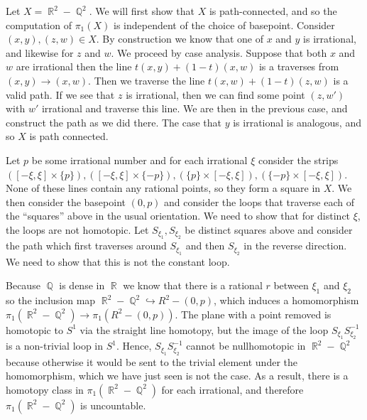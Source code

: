 \documentclass{article}
\DeclareMathOperator{\Q}{\mathbb{Q}}
\DeclareMathOperator{\R}{\mathbb{R}}
\DeclareMathOperator{\into}{\hookrightarrow}
\newcommand{\exercise}[1]{\noindent{\textbf{Exercise #1:}}}
\begin{document}
\exercise{1.2.17}

Let $X = \R^2 - \Q^2$. We will first show that $X$ is path-connected,
and so the computation of $\pi_1(X)$ is independent of the choice of
basepoint. Consider $(x,y),(z,w) \in X$. By construction we know that
one of $x$ and $y$ is irrational, and likewise for $z$ and $w$. We
proceed by case analysis. Suppose that both $x$ and $w$ are irrational
then the line $t(x,y) + (1-t)(x,w)$ is a traverses from $(x,y) \to
(x,w)$. Then we traverse the line $t(x,w) + (1-t)(z,w)$ is a valid
path. If we see that $z$ is irrational, then we can find some point
$(z,w')$ with $w'$ irrational and traverse this line. We are then in
the previous case, and construct the path as we did there. The case
that $y$ is irrational is analogous, and so $X$ is path connected.

Let $p$ be some irrational number and for each irrational $\xi$
consider the strips $([-\xi,\xi] \times \{p\}), ([-\xi,\xi] \times
\{-p\}), (\{p\} \times [-\xi,\xi]), (\{-p\} \times [-\xi,\xi])$. None
of these lines contain any rational points, so they form a square in
$X$. We then consider the basepoint $(0,p)$ and consider the loops
that traverse each of the ``squares'' above in the usual
orientation. We need to show that for distinct $\xi$, the loops are
not homotopic. Let $S_{\xi_1},S_{\xi_2}$ be distinct squares above and
consider the path which first traverses around $S_{\xi_1}$ and then
$S_{\xi_2}$ in the reverse direction. We need to show that this is not
the constant loop.

Because $\Q$ is dense in $\R$ we know that there is a rational $r$
between $\xi_1$ and $\xi_2$ so the inclusion map $\R^2 - \Q^2 \into
R^2 - (0,p)$, which induces a homomorphism $\pi_1(\R^2 - \Q^2) \to
\pi_1(R^2 - (0,p))$. The plane with a point removed is homotopic to
$S^1$ via the straight line homotopy, but the image of the loop
$S_{\xi_1}S_{\xi_2}^{-1}$ is a non-trivial loop in $S^1$. Hence,
$S_{\xi_1}S_{\xi_2}^{-1}$ cannot be nullhomotopic in $\R^2-\Q^2$
because otherwise it would be sent to the trivial element under the
homomorphism, which we have just seen is not the case. As a result,
there is a homotopy class in $\pi_1(\R^2-\Q^2)$ for each irrational,
and therefore $\pi_1(\R^2-\Q^2)$ is uncountable.
\end{document}
